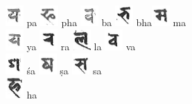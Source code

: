 \documentclass[a4paper,12pt]{article}
\begin{document}
{\includegraphics[height=8.0mm]{pa.jpg} pa \includegraphics[height=8.0mm]{pha.jpg} pha \includegraphics[height=8.0mm]{ba.jpg} ba \includegraphics[height=8.0mm]{bha.jpg} bha\includegraphics[height=8.0mm]{ma.jpg} ma \\
\includegraphics[height=8.0mm]{ya.jpg} ya \includegraphics[height=8.0mm]{ra.jpg} ra \includegraphics[height=8.0mm]{la.jpg} la \includegraphics[height=8.0mm]{va.jpg} va \\
\includegraphics[height=8.0mm]{sha.jpg} śa \includegraphics[height=8.0mm]{ssa.jpg} ṣa \includegraphics[height=8.0mm]{sa.jpg} sa \\
\includegraphics[height=8.0mm]{ha.jpg} ha \\
 
}
\end{document}
